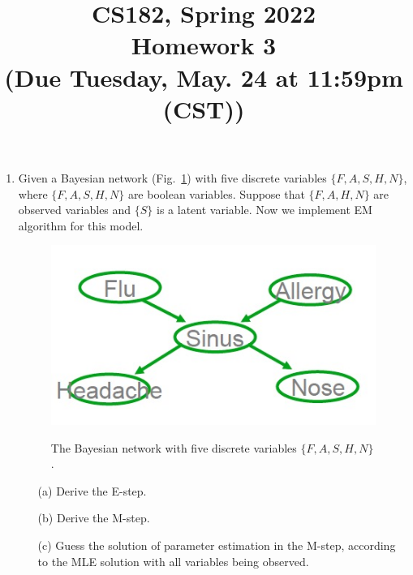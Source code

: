 \documentclass[10pt]{article}
\begin{document}
\date{}
\title{CS182, Spring 2022 \\
	Homework 3\\
	\small (Due Tuesday, May. 24 at 11:59pm (CST))}
\maketitle
\begin{enumerate}


	\item {} Given a Bayesian network (Fig.~\ref{fig3}) with five discrete variables $\{F,A,S,H,N\}$,
	      where $\{F,A,S,H,N\}$ are boolean variables.
	      Suppose that $\{F,A,H,N\}$ are observed variables and $\{S\}$ is a latent variable.
	      Now we implement EM algorithm for this model.
	      \begin{figure}[h!]
		      \centering
		      \includegraphics[width=.4\linewidth]{bn.jpg}
		      \label{fig3}
		      \caption{The Bayesian network with five discrete variables $\{F,A,S,H,N\}$.}
	      \end{figure}
	      \begin{itemize}
		      \item[(a)] Derive the E-step. ~ \\
		      \item[(b)] Derive the M-step. ~ \\
		      \item[(c)] Guess the solution of parameter estimation in the M-step, according to the MLE solution with all variables being observed. ~ \\
	      \end{itemize}


\end{enumerate}
\end{document}
